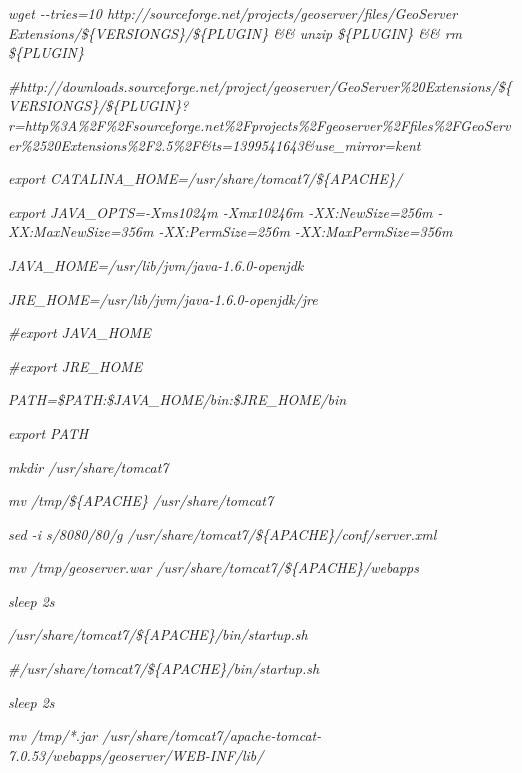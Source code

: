 \documentclass[a4paper]{article}
\begin{document}
{\itshape
wget -{}-tries=10
http://sourceforge.net/projects/geoserver/files/{\textquotedbl}GeoServer
Extensions{\textquotedbl}/\$\{VERSIONGS\}/\$\{PLUGIN\} \&\& unzip
\$\{PLUGIN\} \&\& rm \$\{PLUGIN\}}

{\itshape
\#http://downloads.sourceforge.net/project/geoserver/GeoServer\%20Extensions/\$\{VERSIONGS\}/\$\{PLUGIN\}?r=http\%3A\%2F\%2Fsourceforge.net\%2Fprojects\%2Fgeoserver\%2Ffiles\%2FGeoServer\%2520Extensions\%2F2.5\%2F\&ts=1399541643\&use\_mirror=kent}

{\itshape
export CATALINA\_HOME=/usr/share/tomcat7/\$\{APACHE\}/}

{\itshape
export JAVA\_OPTS={\textquotedbl}-Xms1024m -Xmx10246m -XX:NewSize=256m
-XX:MaxNewSize=356m -XX:PermSize=256m
-XX:MaxPermSize=356m{\textquotedbl}}


\bigskip


\bigskip

{\itshape
JAVA\_HOME=/usr/lib/jvm/java-1.6.0-openjdk}

{\itshape
JRE\_HOME=/usr/lib/jvm/java-1.6.0-openjdk/jre}

{\itshape
\#export JAVA\_HOME}

{\itshape
\#export JRE\_HOME}

{\itshape
PATH=\$PATH:\$JAVA\_HOME/bin:\$JRE\_HOME/bin}

{\itshape
export PATH}


\bigskip

{\itshape
mkdir /usr/share/tomcat7}

{\itshape
mv /tmp/\$\{APACHE\} /usr/share/tomcat7}


\bigskip

{\itshape
sed -i
{\textquotesingle}s/{\textquotedbl}8080{\textquotedbl}/{\textquotedbl}80{\textquotedbl}/g{\textquotesingle}
/usr/share/tomcat7/\$\{APACHE\}/conf/server.xml}


\bigskip

{\itshape
mv /tmp/geoserver.war /usr/share/tomcat7/\$\{APACHE\}/webapps}

{\itshape
sleep 2s}


\bigskip

{\itshape
/usr/share/tomcat7/\$\{APACHE\}/bin/startup.sh}

{\itshape
\#/usr/share/tomcat7/\$\{APACHE\}/bin/startup.sh}


\bigskip

{\itshape
sleep 2s}


\bigskip

{\itshape
mv /tmp/*.jar
/usr/share/tomcat7/apache-tomcat-7.0.53/webapps/geoserver/WEB-INF/lib/}
\end{document}
